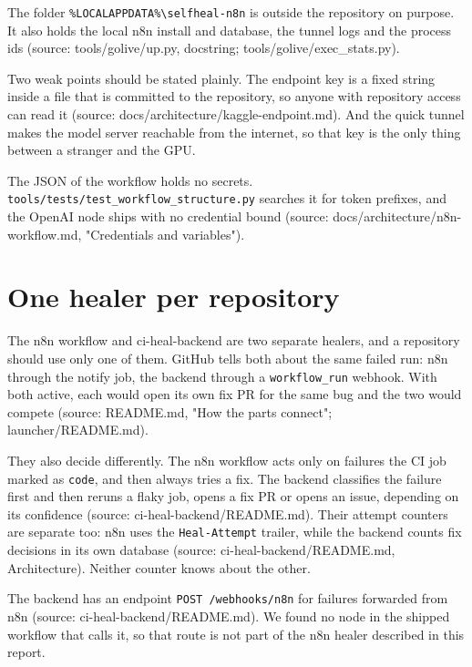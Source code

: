 The folder \texttt{\%LOCALAPPDATA\%\textbackslash{}selfheal-\allowbreak{}n8n} is outside the repository on purpose. It also holds the local n8n install and database, the tunnel logs and the process ids (source: tools/\allowbreak{}golive/\allowbreak{}up.py, docstring; tools/\allowbreak{}golive/\allowbreak{}exec\_\allowbreak{}stats.py).

Two weak points should be stated plainly. The endpoint key is a fixed string inside a file that is committed to the repository, so anyone with repository access can read it (source: docs/\allowbreak{}architecture/\allowbreak{}kaggle-endpoint.md). And the quick tunnel makes the model server reachable from the internet, so that key is the only thing between a stranger and the GPU.

The JSON of the workflow holds no secrets. \texttt{tools/\allowbreak{}tests/\allowbreak{}test\_\allowbreak{}workflow\_\allowbreak{}structure.\allowbreak{}py} searches it for token prefixes, and the OpenAI node ships with no credential bound (source: docs/\allowbreak{}architecture/\allowbreak{}n8n-workflow.md, "Credentials and variables").

\section{One healer per repository}

The n8n workflow and ci-heal-backend are two separate healers, and a repository should use only one of them. GitHub tells both about the same failed run: n8n through the notify job, the backend through a \texttt{workflow\_\allowbreak{}run} webhook. With both active, each would open its own fix PR for the same bug and the two would compete (source: README.md, "How the parts connect"; launcher/\allowbreak{}README.md).

They also decide differently. The n8n workflow acts only on failures the CI job marked as \texttt{code}, and then always tries a fix. The backend classifies the failure first and then reruns a flaky job, opens a fix PR or opens an issue, depending on its confidence (source: ci-heal-backend/\allowbreak{}README.md). Their attempt counters are separate too: n8n uses the \texttt{Heal-\allowbreak{}Attempt} trailer, while the backend counts fix decisions in its own database (source: ci-heal-backend/\allowbreak{}README.md, Architecture). Neither counter knows about the other.

The backend has an endpoint \texttt{POST /\allowbreak{}webhooks/\allowbreak{}n8n} for failures forwarded from n8n (source: ci-heal-backend/\allowbreak{}README.md). We found no node in the shipped workflow that calls it, so that route is not part of the n8n healer described in this report.

